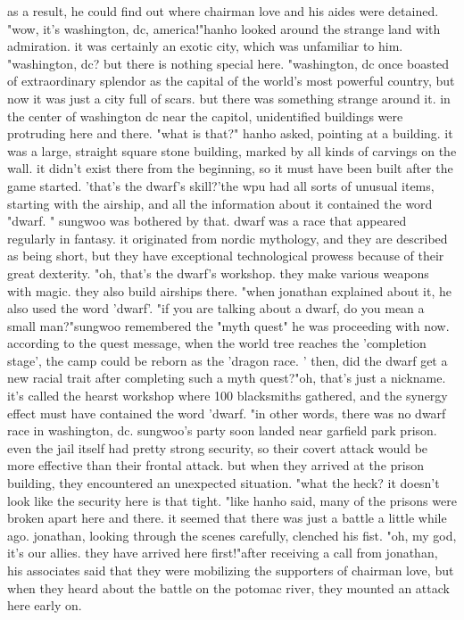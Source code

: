 as a result, he could find out where chairman love and his aides were detained.
"wow, it's washington, dc, america!"hanho looked around the strange land with admiration.
 it was certainly an exotic city, which was unfamiliar to him.
 "washington, dc? but there is nothing special here.
"washington, dc once boasted of extraordinary splendor as the capital of the world's most powerful country, but now it was just a city full of scars.
but there was something strange around it.
 in the center of washington dc near the capitol, unidentified buildings were protruding here and there.
"what is that?" hanho asked, pointing at a building.
it was a large, straight square stone building, marked by all kinds of carvings on the wall.
it didn't exist there from the beginning, so it must have been built after the game started.
'that's the dwarf's skill?'the wpu had all sorts of unusual items, starting with the airship, and all the information about it contained the word "dwarf.
" sungwoo was bothered by that.
 dwarf was a race that appeared regularly in fantasy.
 it originated from nordic mythology, and they are described as being short, but they have exceptional technological prowess because of their great dexterity.
"oh, that's the dwarf's workshop.
 they make various weapons with magic.
 they also build airships there.
"when jonathan explained about it, he also used the word 'dwarf'.
"if you are talking about a dwarf, do you mean a small man?"sungwoo remembered the "myth quest" he was proceeding with now.
 according to the quest message, when the world tree reaches the 'completion stage', the camp could be reborn as the 'dragon race.
'
then, did the dwarf get a new racial trait after completing such a myth quest?"oh, that's just a nickname.
 it's called the hearst workshop where 100 blacksmiths gathered, and the synergy effect must have contained the word 'dwarf.
"in other words, there was no dwarf race in washington, dc.
sungwoo's party soon landed near garfield park prison.
 even the jail itself had pretty strong security, so their covert attack would be more effective than their frontal attack.
 but when they arrived at the prison building, they encountered an unexpected situation.
"what the heck? it doesn't look like the security here is that tight.
"like hanho said, many of the prisons were broken apart here and there.
 it seemed that there was just a battle a little while ago.
 jonathan, looking through the scenes carefully, clenched his fist.
"oh, my god, it's our allies.
 they have arrived here first!"after receiving a call from jonathan, his associates said that they were mobilizing the supporters of chairman love, but when they heard about the battle on the potomac river, they mounted an attack here early on.
